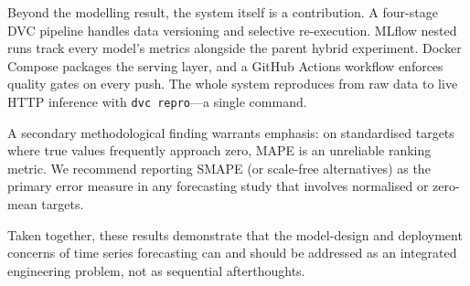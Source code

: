 \documentclass[conference]{IEEEtran}
\begin{document}
  Beyond the modelling result, the system itself is a contribution. A four-stage DVC
  pipeline handles data versioning and selective re-execution. MLflow nested runs
  track every model's metrics alongside the parent hybrid experiment. Docker Compose
  packages the serving layer, and a GitHub Actions workflow enforces quality gates on
  every push. The whole system reproduces from raw data to live HTTP inference with
  \texttt{dvc repro}---a single command.

  A secondary methodological finding warrants emphasis: on standardised targets where
  true values frequently approach zero, MAPE is an unreliable ranking metric. We
  recommend reporting SMAPE (or scale-free alternatives) as the primary error measure
  in any forecasting study that involves normalised or zero-mean targets.

  Taken together, these results demonstrate that the model-design and deployment
  concerns of time series forecasting can and should be addressed as an integrated
  engineering problem, not as sequential afterthoughts.

  
\end{document}
